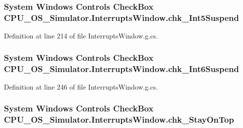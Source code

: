 \subsubsection[{chk\+\_\+\+Int5\+Suspend}]{\setlength{\rightskip}{0pt plus 5cm}System Windows Controls Check\+Box C\+P\+U\+\_\+\+O\+S\+\_\+\+Simulator.\+Interrupts\+Window.\+chk\+\_\+\+Int5\+Suspend\hspace{0.3cm}{\ttfamily [package]}}\label{class_c_p_u___o_s___simulator_1_1_interrupts_window_a8e7a5502f967a939c161b4b614375dec}


Definition at line 214 of file Interrupts\+Window.\+g.\+cs.

\hypertarget{class_c_p_u___o_s___simulator_1_1_interrupts_window_a2f420903e0b66225d706e8b2e9b151ec}{}
\subsubsection[{chk\+\_\+\+Int6\+Suspend}]{\setlength{\rightskip}{0pt plus 5cm}System Windows Controls Check\+Box C\+P\+U\+\_\+\+O\+S\+\_\+\+Simulator.\+Interrupts\+Window.\+chk\+\_\+\+Int6\+Suspend\hspace{0.3cm}{\ttfamily [package]}}\label{class_c_p_u___o_s___simulator_1_1_interrupts_window_a2f420903e0b66225d706e8b2e9b151ec}


Definition at line 246 of file Interrupts\+Window.\+g.\+cs.

\hypertarget{class_c_p_u___o_s___simulator_1_1_interrupts_window_a519c337aaab394e65246e0ce275f2c89}{}
\subsubsection[{chk\+\_\+\+Stay\+On\+Top}]{\setlength{\rightskip}{0pt plus 5cm}System Windows Controls Check\+Box C\+P\+U\+\_\+\+O\+S\+\_\+\+Simulator.\+Interrupts\+Window.\+chk\+\_\+\+Stay\+On\+Top\hspace{0.3cm}{\ttfamily [package]}}\label{class_c_p_u___o_s___simulator_1_1_interrupts_window_a519c337aaab394e65246e0ce275f2c89}


